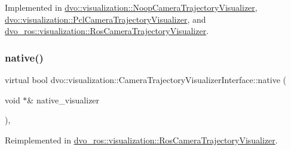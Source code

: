 Implemented in \mbox{\hyperlink{classdvo_1_1visualization_1_1_noop_camera_trajectory_visualizer_afaf7c129a6112015c81a2e25d0002966}{dvo\+::visualization\+::\+Noop\+Camera\+Trajectory\+Visualizer}}, \mbox{\hyperlink{classdvo_1_1visualization_1_1_pcl_camera_trajectory_visualizer_af808188bb664cdaac442f79fe67b40a6}{dvo\+::visualization\+::\+Pcl\+Camera\+Trajectory\+Visualizer}}, and \mbox{\hyperlink{classdvo__ros_1_1visualization_1_1_ros_camera_trajectory_visualizer_a9595c8a8bfceffb2da725b462569404c}{dvo\+\_\+ros\+::visualization\+::\+Ros\+Camera\+Trajectory\+Visualizer}}.

\mbox{\label{classdvo_1_1visualization_1_1_camera_trajectory_visualizer_interface_aa034546bfbdfa55855c56ab21df41b8e}} 
\subsubsection{\texorpdfstring{native()}{native()}}
{\footnotesize\ttfamily virtual bool dvo\+::visualization\+::\+Camera\+Trajectory\+Visualizer\+Interface\+::native (\begin{DoxyParamCaption}\item[{void $\ast$\&}]{native\+\_\+visualizer }\end{DoxyParamCaption})\hspace{0.3cm}{\ttfamily [inline]}, {\ttfamily [virtual]}}



Reimplemented in \mbox{\hyperlink{classdvo__ros_1_1visualization_1_1_ros_camera_trajectory_visualizer_a2e5c80d7dc8308ac038be2e4b71f4e25}{dvo\+\_\+ros\+::visualization\+::\+Ros\+Camera\+Trajectory\+Visualizer}}.

\mbox{\label{classdvo_1_1visualization_1_1_camera_trajectory_visualizer_interface_abcc7ddffc30b41eb9112c386f3e41aa7}} 
